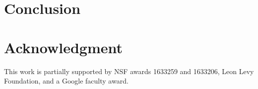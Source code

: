 \documentclass[journal]{IEEEtran}
\begin{document}
\section{Conclusion}


\section*{Acknowledgment}
This work is partially supported by NSF awards 1633259 and 1633206,
Leon Levy Foundation, and a Google faculty award.


\newpage






%



% 
\end{document}
